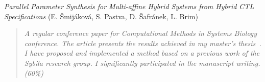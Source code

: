 \medskip
\noindent\PrimaryColor{\spacedlowsmallcaps{[CMSB'20]}}\hspace{3pt} \emph{Parallel Parameter Synthesis for Multi-affine Hybrid Systems from Hybrid CTL Specifications} (E. Šmijáková, S. Pastva, D. Šaf\-rá\-nek, L. Brim)~\cite{Smijakova2020}

\begin{quotation}
	\emph{A regular conference paper for Computational Methods in Systems Biology conference. The article presents the results achieved in my master's thesis~\cite{Smijakova2019}. I have proposed and implemented a method based on a previous work of the Sybila research group. I significantly participated in the manuscript writing. (60\%)}
\end{quotation}







